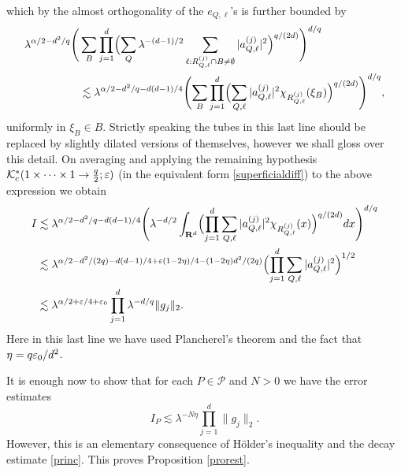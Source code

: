 which by the almost orthogonality of the $e_{Q,\ell}$'s is further
bounded by
\begin{eqnarray*}
\begin{aligned}
\lambda^{\alpha/2-d^{2}/q}
\Biggl(&\sum_{B}\prod_{j=1}^{d}\Bigl(\sum_{Q}\lambda^{-(d-1)/2}
\sum_{\ell: R_{Q,\ell}^{(j)}\cap
B\not=\emptyset}|a_{Q,\ell}^{(j)}|^{2} \Bigr)
^{q/(2d)}\Biggr)^{d/q}\\
&\lesssim\lambda^{\alpha/2-d^{2}/q-d(d-1)/4}
\Biggl(\sum_{B}\prod_{j=1}^{d}\Bigl(\sum_{Q,\ell}
|a_{Q,\ell}^{(j)}|^{2}\chi_{R_{Q,\ell}^{(j)}}(\xi_{B}) \Bigr)
^{q/(2d)}\Biggr)^{d/q},
\end{aligned}
\end{eqnarray*}
uniformly in $\xi_{B}\in B$. Strictly speaking the tubes in this
last line should be replaced by slightly dilated versions of
themselves, however we shall gloss over this detail. On averaging
and applying the remaining hypothesis
${\mathcal{K}}^*_{c}(1\times\cdots\times 1\rightarrow\tfrac{q}{2};\varepsilon)$
(in the equivalent form \eqref{superficialdiff}) to the above
expression we obtain
\begin{eqnarray*}
\begin{aligned}
I&\lesssim\lambda^{\alpha/2-d^{2}/q-d(d-1)/4}
\Biggl(\lambda^{-d/2}\int_{{\bf
R}^d}\Bigl(\prod_{j=1}^{d}\sum_{Q,\ell}
|a_{Q,\ell}^{(j)}|^{2}\chi_{R_{Q,\ell}^{(j)}}(x) \Bigr)
^{q/(2d)}dx\Biggr)^{d/q}\\
&\lesssim\lambda^{\alpha/2-d^{2}/(2q)-d(d-1)/4+\varepsilon(1-2\eta)/4-(1-2\eta)d^{2}/(2q)}
\Bigl(\prod_{j=1}^{d}\sum_{Q,\ell}|a_{Q,\ell}^{(j)}|^{2}\Bigr)^{1/2}\\
&\lesssim
\lambda^{\alpha/2+\varepsilon/4+\varepsilon_{0}}\prod_{j=1}^{d}\lambda^{-d/q}\|g_{j}\|_{2}.
\end{aligned}
\end{eqnarray*}
Here in this last line we have used Plancherel's theorem and the
fact that $\eta=q\varepsilon_{0}/d^{2}$.

It is enough now to show that for each $P\in\mathcal{P}$ and $N>0$
we have the error estimates
$$I_{P}\lesssim\lambda^{-N\eta}\prod_{j=1}^{d}\|g_{j}\|_{2}.$$
However, this is an elementary consequence of H\"older's
inequality and the decay estimate \eqref{princ}.  This proves Proposition \ref{prorest}.

